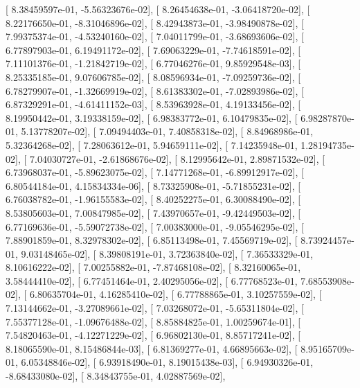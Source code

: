 \documentclass{article}
\begin{document}
       [  8.38459597e-01,  -5.56323676e-02],
       [  8.26454638e-01,  -3.06418720e-02],
       [  8.22176650e-01,  -8.31046896e-02],
       [  8.42943873e-01,  -3.98490878e-02],
       [  7.99375374e-01,  -4.53240160e-02],
       [  7.04011799e-01,  -3.68693606e-02],
       [  6.77897903e-01,   6.19491172e-02],
       [  7.69063229e-01,  -7.74618591e-02],
       [  7.11101376e-01,  -1.21842719e-02],
       [  6.77046276e-01,   9.85929548e-03],
       [  8.25335185e-01,   9.07606785e-02],
       [  8.08596934e-01,  -7.09259736e-02],
       [  6.78279907e-01,  -1.32669919e-02],
       [  8.61383302e-01,  -7.02893986e-02],
       [  6.87329291e-01,  -4.61411152e-03],
       [  8.53963928e-01,   4.19133456e-02],
       [  8.19950442e-01,   3.19338159e-02],
       [  6.98383772e-01,   6.10479835e-02],
       [  6.98287870e-01,   5.13778207e-02],
       [  7.09494403e-01,   7.40858318e-02],
       [  8.84968986e-01,   5.32364268e-02],
       [  7.28063612e-01,   5.94659111e-02],
       [  7.14235948e-01,   1.28194735e-02],
       [  7.04030727e-01,  -2.61868676e-02],
       [  8.12995642e-01,   2.89871532e-02],
       [  6.73968037e-01,  -5.89623075e-02],
       [  7.14771268e-01,  -6.89912917e-02],
       [  6.80544184e-01,   4.15834334e-06],
       [  8.73325908e-01,  -5.71855231e-02],
       [  6.76038782e-01,  -1.96155583e-02],
       [  8.40252275e-01,   6.30088490e-02],
       [  8.53805603e-01,   7.00847985e-02],
       [  7.43970657e-01,  -9.42449503e-02],
       [  6.77169636e-01,  -5.59072738e-02],
       [  7.00383000e-01,  -9.05546295e-02],
       [  7.88901859e-01,   8.32978302e-02],
       [  6.85113498e-01,   7.45569719e-02],
       [  8.73924457e-01,   9.03148465e-02],
       [  8.39808191e-01,   3.72363840e-02],
       [  7.36533329e-01,   8.10616222e-02],
       [  7.00255882e-01,  -7.87468108e-02],
       [  8.32160065e-01,   3.58444410e-02],
       [  6.77451464e-01,   2.40295056e-02],
       [  6.77768523e-01,   7.68553908e-02],
       [  6.80635704e-01,   4.16285410e-02],
       [  6.77788865e-01,   3.10257559e-02],
       [  7.13144662e-01,  -3.27089661e-02],
       [  7.03268072e-01,  -5.65311804e-02],
       [  7.55377128e-01,  -1.09676488e-02],
       [  8.85884825e-01,   1.00259674e-01],
       [  7.54820463e-01,  -4.12271229e-02],
       [  6.96802130e-01,   8.85717241e-02],
       [  8.18065590e-01,   8.15486844e-03],
       [  6.81369277e-01,   4.66895663e-02],
       [  8.95165709e-01,   6.05348846e-02],
       [  6.93918490e-01,   8.19015438e-03],
       [  6.94930326e-01,  -8.68433080e-02],
       [  8.34843755e-01,   4.02887569e-02],
\end{document}
